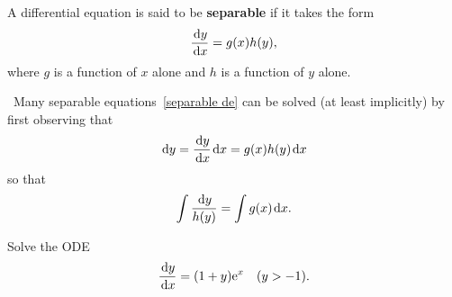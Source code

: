 \ifdefined\SOLUTION
{}
\else
\fi


\newpage

\begin{definition}
A differential equation is said to be \textbf{separable} if it takes the form
\begin{equation}\label{separable de}
\frac{\mkern 2mu \mathrm{d} y}{\mkern 2mu \mathrm{d} x} = g(x)h(y),
\end{equation}
where $g$ is a function of $x$ alone and $h$ is a function of $y$ alone.
\end{definition}

\begin{remark}\,
Many separable equations~\eqref{separable de} can be solved (at least implicitly) by first observing that
\begin{equation*}
\mkern 2mu \mathrm{d} y = \frac{\mkern 2mu \mathrm{d} y}{\mkern 2mu \mathrm{d} x}\mkern 2mu \mathrm{d} x = g(x)h(y)\mkern 2mu \mathrm{d} x
\end{equation*}
so that
\begin{equation*}
\int\frac{\mkern 2mu \mathrm{d} y}{h(y)} = \int g(x)\mkern 2mu \mathrm{d} x.
\end{equation*}
\end{remark}

\begin{example}
Solve the ODE
\begin{equation*}
\frac{\mkern 2mu \mathrm{d} y}{\mkern 2mu \mathrm{d} x} = (1+y)\mathrm{e}^x\quad (y>-1).
\end{equation*}
\end{example}

